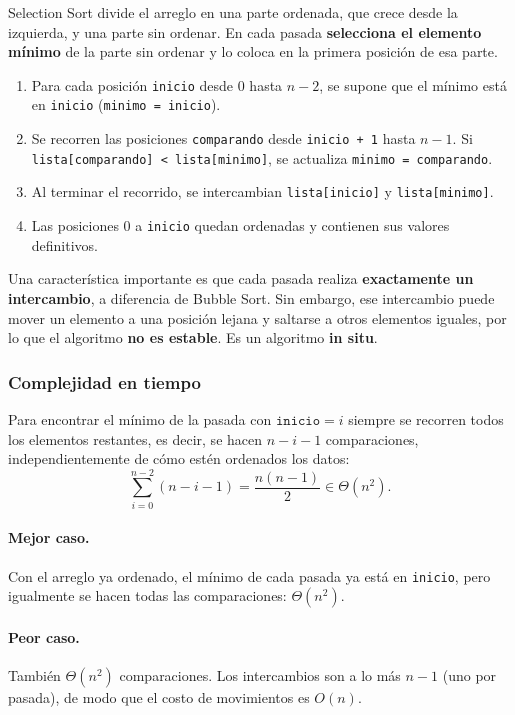 \documentclass[11pt,letterpaper]{article}
\begin{document}
Selection Sort divide el arreglo en una parte ordenada, que crece desde la izquierda, y una parte sin ordenar. En cada pasada \textbf{selecciona el elemento mínimo} de la parte sin ordenar y lo coloca en la primera posición de esa parte.

\begin{enumerate}
  \item Para cada posición \texttt{inicio} desde $0$ hasta $n-2$, se supone que el mínimo está en \texttt{inicio} (\texttt{minimo = inicio}).
  \item Se recorren las posiciones \texttt{comparando} desde \texttt{inicio + 1} hasta $n-1$. Si \texttt{lista[comparando] < lista[minimo]}, se actualiza \texttt{minimo = comparando}.
  \item Al terminar el recorrido, se intercambian \texttt{lista[inicio]} y \texttt{lista[minimo]}.
  \item Las posiciones $0$ a \texttt{inicio} quedan ordenadas y contienen sus valores definitivos.
\end{enumerate}

Una característica importante es que cada pasada realiza \textbf{exactamente un intercambio}, a diferencia de Bubble Sort. Sin embargo, ese intercambio puede mover un elemento a una posición lejana y saltarse a otros elementos iguales, por lo que el algoritmo \textbf{no es estable}. Es un algoritmo \textbf{in situ}.

\subsubsection{Complejidad en tiempo}

Para encontrar el mínimo de la pasada con $\texttt{inicio} = i$ siempre se recorren todos los elementos restantes, es decir, se hacen $n-i-1$ comparaciones, independientemente de cómo estén ordenados los datos:
\[
  \sum_{i=0}^{n-2} (n-i-1) = \frac{n(n-1)}{2} \in \Theta(n^2).
\]

\paragraph{Mejor caso.} Con el arreglo ya ordenado, el mínimo de cada pasada ya está en \texttt{inicio}, pero igualmente se hacen todas las comparaciones: $\Theta(n^2)$.

\paragraph{Peor caso.} También $\Theta(n^2)$ comparaciones. Los intercambios son a lo más $n-1$ (uno por pasada), de modo que el costo de movimientos es $O(n)$.
\end{document}
